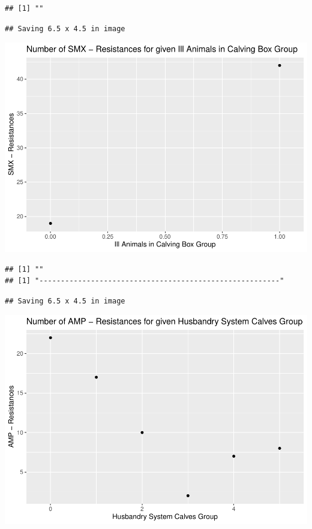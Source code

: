 \documentclass[
]{article}
\begin{document}
\begin{verbatim}
## [1] ""
\end{verbatim}

\begin{verbatim}
## Saving 6.5 x 4.5 in image
\end{verbatim}

\includegraphics{NResistenzen_files/figure-latex/binary_or_nominal_variables-30.pdf}

\begin{verbatim}
## [1] ""
## [1] "--------------------------------------------------------"
\end{verbatim}

\begin{verbatim}
## Saving 6.5 x 4.5 in image
\end{verbatim}

\includegraphics{NResistenzen_files/figure-latex/binary_or_nominal_variables-31.pdf}
\end{document}
